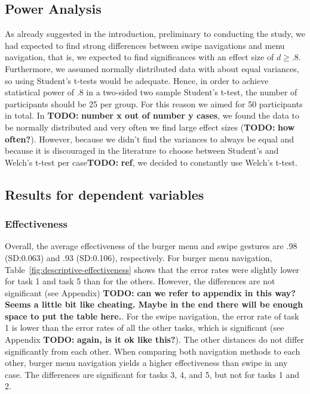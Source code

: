 \documentclass{sig-alternate-05-2015}
\newcommand{\todo}{\textbf{TODO:} \textbf}
\begin{document}
\subsection{Power Analysis}
As already suggested in the introduction, preliminary to conducting the study, we had expected to find strong differences between swipe navigations and menu navigation, that is,
we expected to find significances with an effect size of $d \geq .8$.
Furthermore, we assumed normally distributed data with about equal variances, so using Student's t-tests would be adequate. Hence, in order to achieve statistical power of .8 in a 
two-sided two sample Student's t-test, the number 
of participants should be 25 per group. For this reason we aimed for 50 participants in total. In \todo{number x out of number y cases}, we found the data to be normally distributed and
very often we find large effect sizes (\todo{how often?}). However, because we didn't find the variances to always be equal and because it is discouraged in the literature to
choose between Student's and Welch's t-test per case\todo{ref}, we decided to constantly use Welch's t-test.
\subsection{Results for dependent variables}
\subsubsection{Effectiveness}
Overall, the average effectiveness of the burger menu and swipe gestures are .98 (SD:\@0.063) and .93 (SD:\@0.106), respectively. For burger menu navigation, 
Table~\ref{fig:descriptive-effectiveness} shows that the error rates were slightly lower for task 1 and task 5 than for the others. However, the differences
are not significant (see Appendix) \todo{can we refer to appendix in this way? Seems a little bit like cheating. Maybe in the end there will be enough space to put the 
table here.}. For the swipe navigation, the error rate of task 1 is lower than the error rates of all the other
tasks, which is significant (see Appendix \todo{again, is it ok like this?}).
The other distances do not differ significantly from each other. When
comparing both navigation methods to each other, burger menu navigation yields a higher effectiveness than swipe in any case.
The differences are significant for tasks 3, 4, and 5,
but not for tasks 1 and 2.
\begin{table}[!h]
\centering
\caption{Mean (standard deviation) of effectiveness}
\label{fig:descriptive-effectiveness}
\end{table}
\end{document}

